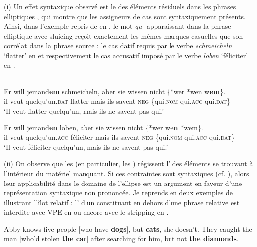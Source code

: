 (i) Un effet syntaxique observé est le  des éléments résiduels dans les phrases elliptiques \citep{Ross1967,Ross1969,Merchant2001,Merchant2004}, qui montre que les assigneurs de cas sont syntaxiquement présents. Ainsi, dans l’exemple  repris de \citet{Ross1969} en , le mot \textit{qu-} apparaissant dans la phrase elliptique avec sluicing reçoit exactement les mêmes marques casuelles que son corrélat dans la phrase source : le cas datif requis par le verbe \textit{schmeicheln} ‘flatter’ en  et respectivement le cas accusatif imposé par le verbe \textit{loben} ‘féliciter’ en . 

\newpage 
\ea \label{ch1:ex107}
\\
\ea  
\gll Er  will  jemand\textbf{em}  schmeicheln,  aber  sie  wissen  nicht  \{*wer {\textbar} *wen {\textbar} w\textbf{em}\}. \label{ch1:ex107a}\\
il  veut  quelqu’un.\textsc{dat}  flatter  mais  ils  savent  \textsc{neg}  \{qui.\textsc{nom} {\textbar} qui.\textsc{acc} {\textbar} qui.\textsc{dat}\}\\
\glt ‘Il veut flatter quelqu’un, mais ils ne savent pas qui.’ 

\ex
\gll  Er  will  jemand\textbf{en}  loben,  aber  sie  wissen  nicht  \{*wer  {\textbar} w\textbf{en}  {\textbar} *wem\}. \label{ch1:ex107b}\\
il  veut  quelqu’un.\textsc{acc}  féliciter  mais  ils  savent  \textsc{neg}  \{qui.\textsc{nom}  {\textbar} qui.\textsc{acc} {\textbar} qui.\textsc{dat}\}\\
\glt ‘Il veut féliciter quelqu’un, mais ils ne savent pas qui.’ 
\z
\z 

(ii) On observe que les  (en particulier, les ) régissent l’ des éléments se trouvant à l’intérieur du matériel manquant. Si ces contraintes sont syntaxiques (cf. \citealt{Sag1976}), alors leur applicabilité dans le domaine de l’ellipse est un argument en faveur d’une représentation syntaxique non prononcée. Je reprends en  deux exemples de \citet{Merchant2009} illustrant l’îlot relatif : l’ d’un constituant en dehors d’une phrase relative est interdite avec VPE en  ou encore avec le stripping en .

\ea \label{ch1:ex108}
\ea  *Abby knows five people [who have \textbf{dogs}], but \textbf{cats}, she doesn’t. \label{ch1:ex108a} 
\ex  *They caught the man [who’d stolen \textbf{the car}] after searching for him, but not \textbf{the diamonds}. \label{ch1:ex108b}  
\z
\z

